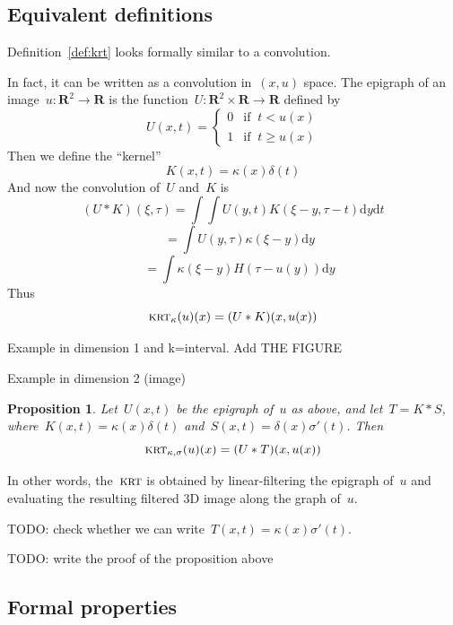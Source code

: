 \documentclass[12pt]{article}                  %
\newtheorem{proposition}{Proposition}
\begin{document}
\subsection{Equivalent definitions}


Definition~\ref{def:krt} looks formally similar to a convolution.

In fact, it can be written as a convolution in~$(x,u)$ space.
The epigraph of an image~$u:\mathbf{R}^2\to\mathbf{R}$ is the
function~$U:\mathbf{R}^2\times\mathbf{R}\to\mathbf{R}$ defined by
\[
	U(x,t) = \begin{cases}
		0 & \textrm{if $\ t< u(x)$} \\
		1 & \textrm{if $\ t\ge u(x)$}
	\end{cases}
\]
Then we define the ``kernel''
\[
	K(x,t) = \kappa(x)\delta(t)
\]
And now the convolution of~$U$ and~$K$ is
\[
	(U*K)(\xi,\tau)
	=
	\int
	\int U\left(y,t\right)K\left(\xi-y,\tau-t\right)
		\mathrm{d} y
		\mathrm{d} t
\]
\[
	\quad
	=\int
	U(y,\tau)
	\kappa(\xi - y)
		\mathrm{d} y
\]
\[
	\quad
	=\int\kappa(\xi-y)H(\tau - u(y))
		\mathrm{d} y
\]
Thus
\begin{equation}\label{eq:convolution1}
	\textsc{krt}_\kappa(u)(x)=(U*K)(x,u(x))
\end{equation}

Example in dimension 1 and k=interval.  Add THE FIGURE

Example in dimension 2 (image)

\begin{proposition}
Let~$U(x,t)$ be the epigraph of~$u$ as above, and let~$T=K*S$,
where~$K(x,t)=\kappa(x)\delta(t)$ and~$S(x,t)=\delta(x)\sigma'(t)$.  Then
\[
	\textsc{krt}_{\kappa,\sigma}(u)(x) = (U*T)(x,u(x))
\]
\end{proposition}
In other words, the~$\textsc{krt}$ is obtained by
linear-filtering the epigraph of~$u$ and evaluating the resulting filtered
3D image along the graph of~$u$.

TODO: check whether we can write~$T(x,t)=\kappa(x)\sigma'(t)$.

TODO: write the proof of the proposition above

\subsection{Formal properties}
\end{document}
